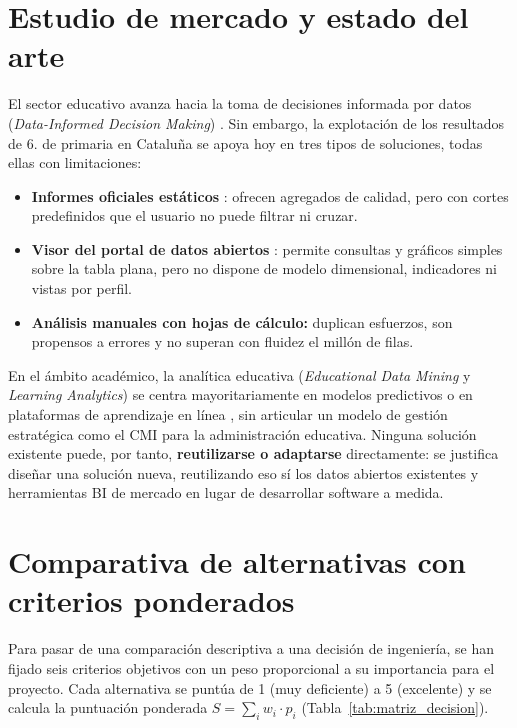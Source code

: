 \documentclass[12pt, a4paper, oneside]{report}
\begin{document}
\section{Estudio de mercado y estado del arte}
El sector educativo avanza hacia la toma de decisiones informada por datos (\textit{Data-Informed Decision Making}) \cite{mandinach2012data}. Sin embargo, la explotación de los resultados de 6.\textordmasculine{} de primaria en Cataluña se apoya hoy en tres tipos de soluciones, todas ellas con limitaciones:
\begin{itemize}
    \item \textbf{Informes oficiales estáticos} \cite{csase_resultats}: ofrecen agregados de calidad, pero con cortes predefinidos que el usuario no puede filtrar ni cruzar.
    \item \textbf{Visor del portal de datos abiertos} \cite{transparencia_catalunya_2024}: permite consultas y gráficos simples sobre la tabla plana, pero no dispone de modelo dimensional, indicadores ni vistas por perfil.
    \item \textbf{Análisis manuales con hojas de cálculo:} duplican esfuerzos, son propensos a errores y no superan con fluidez el millón de filas.
\end{itemize}
En el ámbito académico, la analítica educativa (\textit{Educational Data Mining} y \textit{Learning Analytics}) se centra mayoritariamente en modelos predictivos o en plataformas de aprendizaje en línea \cite{romero2010educational}, sin articular un modelo de gestión estratégica como el CMI para la administración educativa. Ninguna solución existente puede, por tanto, \textbf{reutilizarse o adaptarse} directamente: se justifica diseñar una solución nueva, reutilizando eso sí los datos abiertos existentes y herramientas BI de mercado en lugar de desarrollar software a medida.

\section{Comparativa de alternativas con criterios ponderados}
Para pasar de una comparación descriptiva a una decisión de ingeniería, se han fijado seis criterios objetivos con un peso proporcional a su importancia para el proyecto. Cada alternativa se puntúa de 1 (muy deficiente) a 5 (excelente) y se calcula la puntuación ponderada $S = \sum_i w_i \cdot p_i$ (Tabla~\ref{tab:matriz_decision}).
\end{document}
